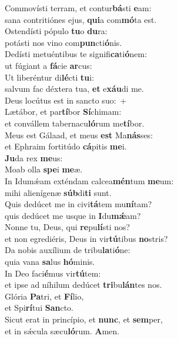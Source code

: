 \evenverse Commovísti terram, et contur\textbf{bá}sti \textbf{e}am:~\*\\
\evenverse sana contritiónes ejus, \textbf{qui}a com\textbf{mó}ta est.\\
\oddverse Ostendísti pópulo \textbf{tu}o \textbf{du}ra:~\*\\
\oddverse potásti nos vino com\textbf{pun}cti\textbf{ó}nis.\\
\evenverse Dedísti metuéntibus te signifi\textbf{ca}ti\textbf{ó}nem:~\*\\
\evenverse ut fúgiant a \textbf{fá}cie \textbf{ar}cus:\\
\oddverse Ut liberéntur di\textbf{lé}cti \textbf{tu}i:~\*\\
\oddverse salvum fac déxtera tua, \textbf{et} e\textbf{xáu}di me.\\
\evenverse Deus locútus est in sancto suo:~+\\
\evenverse  Lætábor, et par\textbf{tí}bor \textbf{Sí}chimam:~\*\\
\evenverse et convállem tabernacu\textbf{ló}rum me\textbf{tí}bor.\\
\oddverse Meus est Gálaad, et meus \textbf{est} Ma\textbf{nás}ses:~\*\\
\oddverse et Ephraim fortitúdo \textbf{cá}pitis \textbf{me}i.\\
\evenverse \textbf{Ju}da rex \textbf{me}us:~\*\\
\evenverse Moab olla \textbf{spe}i \textbf{me}æ.\\
\oddverse In Idumǽam exténdam calcea\textbf{mén}tum \textbf{me}um:~\*\\
\oddverse mihi alienígenæ \textbf{súb}di\textbf{ti} sunt.\\
\evenverse Quis dedúcet me in civi\textbf{tá}tem mu\textbf{ní}tam?~\*\\
\evenverse quis dedúcet me usque in \textbf{I}du\textbf{mǽ}am?\\
\oddverse Nonne tu, Deus, qui \textbf{re}pu\textbf{lí}sti nos?~\*\\
\oddverse et non egrediéris, Deus in vir\textbf{tú}tibus \textbf{no}stris?\\
\evenverse Da nobis auxílium de tribu\textbf{la}ti\textbf{ó}ne:~\*\\
\evenverse quia vana \textbf{sa}lus \textbf{hó}minis.\\
\oddverse In Deo faci\textbf{é}mus vir\textbf{tú}tem:~\*\\
\oddverse et ipse ad níhilum dedúcet \textbf{tri}bu\textbf{lán}tes nos.\\
\evenverse Glória \textbf{Pa}tri, et \textbf{Fí}lio,~\*\\
\evenverse et Spi\textbf{rí}tui \textbf{San}cto.\\
\oddverse Sicut erat in princípio, et \textbf{nunc}, et \textbf{sem}per,~\*\\
\oddverse et in sǽcula sæcu\textbf{ló}rum. \textbf{A}men.\\
